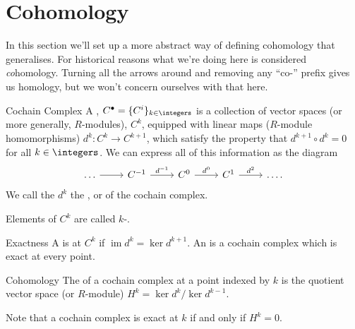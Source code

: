\documentclass[fleqn]{NotesClass}
\DeclareMathOperator{\im}{im}
\begin{document}
    \section{Cohomology}
    In this section we'll set up a more abstract way of defining cohomology that generalises.
    For historical reasons what we're doing here is considered \emph{co}homology.
    Turning all the arrows around and removing any \enquote{co-} prefix gives us homology, but we won't concern ourselves with that here.
    
    \begin{dfn}{Cochain Complex}{}
        A , \(C^{\bullet} = \{C^i\}_{k \in \integers}\) is a collection of vector spaces (or more generally, \(R\)-modules), \(C^k\), equipped with linear maps (\(R\)-module homomorphisms) \(d^k \colon C^k \to C^{k+1}\), which satisfy the property that \(d^{k + 1} \circ d^{k} = 0\) for all \(k \in \integers\).
        We can express all of this information as the diagram
        \begin{equation}
                \begin{tikzcd}
                    \dots \arrow[r] & C^{-1} \arrow[r, "d^{-1}"] & C^0 \arrow[r, "d^0"] & C^1 \arrow[r, "d^2"] & \dots.
                \end{tikzcd}
        \end{equation}
        We call the \(d^k\) the , or  of the cochain complex.
        
        Elements of \(C^k\) are called \(k\)-.
    \end{dfn}
    
    \begin{dfn}{Exactness}{}
        A  is  at \(C^k\) if \(\im d^{k} = \ker d^{k+1}\).
        An  is a cochain complex which is exact at every point.
    \end{dfn}
    
    \begin{dfn}{Cohomology}{}
        The  of a cochain complex at a point indexed by \(k\) is the quotient vector space (or \(R\)-module) \(H^k = \ker d^k/\ker d^{k-1}\).
    \end{dfn}
    
    Note that a cochain complex is exact at \(k\) if and only if \(H^k = 0\).
    
\end{document}
